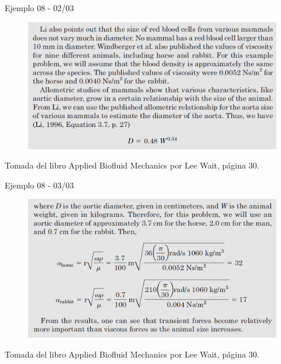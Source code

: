 \begin{frame}{Ejemplo 08 - 02/03}
\justifying
\begin{figure}[H]
\centering
\includegraphics[scale=0.4]{Section_Files/picmanuel/44.png}
\label{fig: Figura2-37}
\end{figure}
{\tiny Tomada del libro Applied Biofluid Mechanics por Lee Wait, página 30.}
\end{frame}

\begin{frame}{Ejemplo 08 - 03/03}
\justifying
\begin{figure}[H]
\centering
\includegraphics[scale=0.4]{Section_Files/picmanuel/45.png}
\label{fig: Figura2-38}
\end{figure}
{\tiny Tomada del libro Applied Biofluid Mechanics por Lee Wait, página 30.}
\end{frame}

